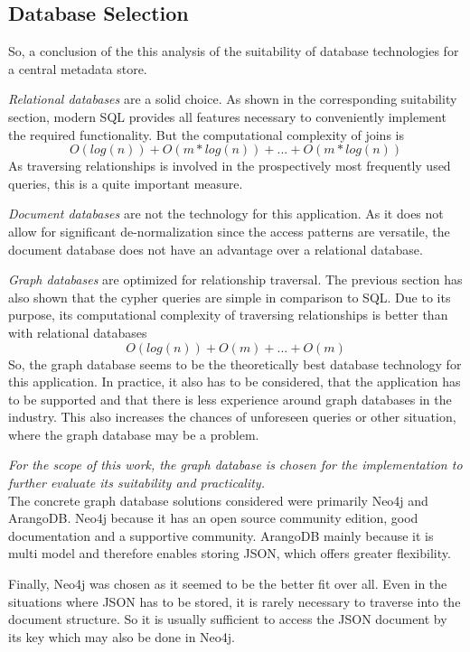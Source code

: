 \subsection{Database Selection}
So, a conclusion of the this analysis of the suitability of database technologies for a central metadata store.\par 
\emph{Relational databases} are a solid choice. As shown in the corresponding suitability section, modern SQL provides all features necessary to conveniently implement the required functionality. But the computational complexity of joins is 
$$O(log(n)) + O(m*log(n)) + ... + O(m*log(n))$$
As traversing relationships is involved in the prospectively most frequently used queries, this is a quite important measure.\par 
\emph{Document databases} are not the technology for this application. As it does not allow for significant de-normalization since the access patterns are versatile, the document database does not have an advantage over a relational database.\par 
\emph{Graph databases} are optimized for relationship traversal. The previous section has also shown that the cypher queries are simple in comparison to SQL. Due to its purpose, its computational complexity of traversing relationships is better than with relational databases
$$O(log(n)) + O(m) + ... + O(m)$$
So, the graph database seems to be the theoretically best database technology for this application. In practice, it also has to be considered, that the application has to be supported and that there is less experience around graph databases in the industry. This also increases the chances of unforeseen queries or other situation, where the graph database may be a problem.\par 
\emph{For the scope of this work, the graph database is chosen for the implementation to further evaluate its suitability and practicality.}\\

The concrete graph database solutions considered were primarily Neo4j and ArangoDB. Neo4j because it has an open source community edition, good documentation and a supportive community. ArangoDB mainly because it is multi model and therefore enables storing JSON, which offers greater flexibility.\par 
Finally, Neo4j was chosen as it seemed to be the better fit over all. Even in the situations where JSON has to be stored, it is rarely necessary to traverse into the document structure. So it is usually sufficient to access the JSON document by its key which may also be done in Neo4j.

